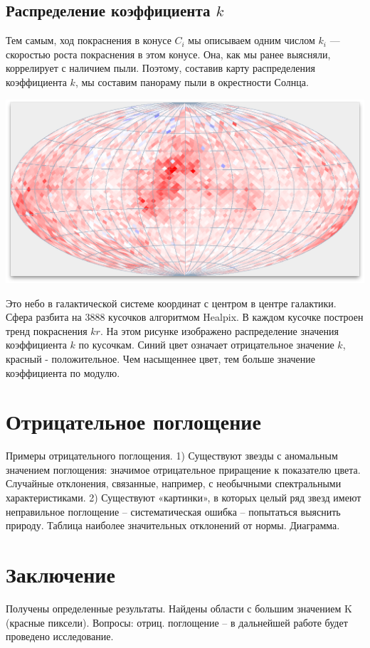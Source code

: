 \documentclass[14pt]{article}
\begin{document}
		\subsection{Распределение коэффициента $k$}
			Тем самым, ход покраснения в конусе $C_i$ мы описываем одним числом $k_i$ --- скоростью роста покраснения в этом конусе. Она, как мы ранее выясняли, коррелирует с наличием пыли. Поэтому, составив карту распределения коэффициента $k$, мы составим панораму пыли в окрестности Солнца. 
			\begin{center}
				\includegraphics[scale=0.3]{../../presentation/map-k.png}
			\end{center}	
			Это небо в галактической системе координат с центром в центре галактики. Сфера разбита на 3888 кусочков алгоритмом Healpix. В каждом кусочке построен тренд покраснения $k r$. На этом рисунке изображено распределение значения коэффициента $k$ по кусочкам. Синий цвет означает отрицательное значение $k$, красный - положительное. Чем насыщеннее цвет, тем больше значение коэффициента по модулю.  
			
	
	\section{Отрицательное поглощение}
		Примеры отрицательного поглощения. 1) Существуют звезды с аномальным значением поглощения: значимое отрицательное приращение к показателю цвета. Случайные отклонения, связанные, например, с необычными спектральными характеристиками. 2) Существуют «картинки», в которых целый ряд звезд имеют неправильное поглощение – систематическая ошибка – попытаться выяснить природу. Таблица наиболее значительных отклонений от нормы. Диаграмма.	
	
	
	\section{Заключение}        
        	Получены определенные результаты. Найдены области с большим значением K (красные пиксели). Вопросы: отриц. поглощение – в дальнейшей работе будет проведено исследование.
        
\end{document}
